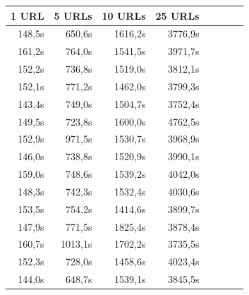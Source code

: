 \documentclass{scrartcl}
\begin{document}
\begin{table}[h]
\center
\begin{tabular}{@{}llllllll@{}}
\toprule
1 URL       & 5 URLs      & 10 URLs      & 25 URLs      \\ \midrule
\multicolumn{1}{r}{148,5s} & \multicolumn{1}{r}{650,6s} & \multicolumn{1}{r}{1616,2s} & \multicolumn{1}{r}{3776,9s} \\
 \multicolumn{1}{r}{161,2s} & \multicolumn{1}{r}{764,0s} & \multicolumn{1}{r}{1541,5s} & \multicolumn{1}{r}{3971,7s} \\
 \multicolumn{1}{r}{152,2s} & \multicolumn{1}{r}{736,8s} & \multicolumn{1}{r}{1519,0s} & \multicolumn{1}{r}{3812,1s} \\
 \multicolumn{1}{r}{152,1s} & \multicolumn{1}{r}{771,2s} & \multicolumn{1}{r}{1462,0s} & \multicolumn{1}{r}{3799,3s} \\
 \multicolumn{1}{r}{143,4s} & \multicolumn{1}{r}{749,0s} & \multicolumn{1}{r}{1504,7s} & \multicolumn{1}{r}{3752,4s} \\
 \multicolumn{1}{r}{149,5s} & \multicolumn{1}{r}{723,8s} & \multicolumn{1}{r}{1600,0s} & \multicolumn{1}{r}{4762,5s} \\
 \multicolumn{1}{r}{152,9s} & \multicolumn{1}{r}{971,5s} & \multicolumn{1}{r}{1530,7s} & \multicolumn{1}{r}{3968,9s} \\
 \multicolumn{1}{r}{146,0s} & \multicolumn{1}{r}{738,8s} & \multicolumn{1}{r}{1520,9s} & \multicolumn{1}{r}{3990,1s} \\
 \multicolumn{1}{r}{159,0s} & \multicolumn{1}{r}{748,6s} & \multicolumn{1}{r}{1539,2s} & \multicolumn{1}{r}{4042,0s} \\
 \multicolumn{1}{r}{148,3s} & \multicolumn{1}{r}{742,3s} & \multicolumn{1}{r}{1532,4s} & \multicolumn{1}{r}{4030,6s} \\
 \multicolumn{1}{r}{153,5s} & \multicolumn{1}{r}{754,2s} & \multicolumn{1}{r}{1414,6s} & \multicolumn{1}{r}{3899,7s} \\
 \multicolumn{1}{r}{147,9s} & \multicolumn{1}{r}{771,5s} & \multicolumn{1}{r}{1825,4s} & \multicolumn{1}{r}{3878,4s} \\
 \multicolumn{1}{r}{160,7s} & \multicolumn{1}{r}{1013,1s} & \multicolumn{1}{r}{1702,2s} & \multicolumn{1}{r}{3735,5s} \\
 \multicolumn{1}{r}{152,3s} & \multicolumn{1}{r}{728,0s} & \multicolumn{1}{r}{1458,6s} & \multicolumn{1}{r}{4023,4s} \\
 \multicolumn{1}{r}{144,0s} & \multicolumn{1}{r}{648,7s} & \multicolumn{1}{r}{1539,1s} & \multicolumn{1}{r}{3845,5s} \\

\end{tabular}
\end{table}
\end{document}
